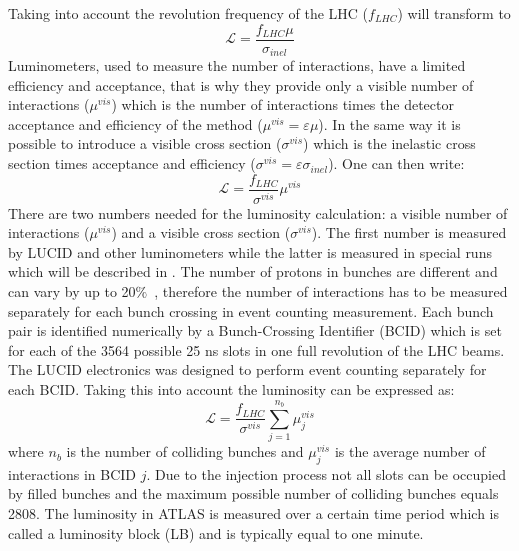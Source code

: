 Taking into account the revolution frequency of the LHC ($f_{LHC}$)  will transform to
\begin{equation}
\mathscr{L} = \dfrac{f_{LHC} \mu}{\sigma_{inel}}
\label{eq:lumi_average_mu}
\end{equation}
Luminometers, used to measure the number of interactions, have a limited efficiency and acceptance, 
that is why they provide only a visible number of interactions ($\mu^{vis}$) which is the number of interactions 
times the detector acceptance and efficiency of the method ($\mu^{vis} = \varepsilon \mu$).
In the same way it is possible to introduce a visible cross section ($\sigma^{vis}$) which is the inelastic 
cross section times acceptance and efficiency ($\sigma^{vis} = \varepsilon \sigma_{inel}$).
One can then write:
\begin{equation}
\mathscr{L} = \dfrac{f_{LHC}}{\sigma^{vis}} \mu^{vis}
\label{eq:lumi_bunch_sum_visible}
\end{equation}
There are two numbers needed for the luminosity calculation: a visible number of interactions ($\mu^{vis}$) and a visible cross section ($\sigma^{vis}$). 
The first number is measured by LUCID and other luminometers while the latter is measured in special runs which will be described in . 
The number of protons in bunches are different and can vary by up to 20$\%$~\cite{Aad:2013ucp}, 
therefore the number of interactions has to be measured separately for each bunch crossing in event counting measurement.
Each bunch pair is identified numerically by a Bunch-Crossing Identifier (BCID) which is set for each of the 3564 possible 25 ns slots in one full revolution of the LHC beams.
The LUCID electronics was designed to perform event counting separately for each BCID. 
Taking this into account the luminosity can be expressed as:
\begin{equation}
\mathscr{L} = \dfrac{f_{LHC}}{\sigma^{vis}} \sum_{j=1}^{n_{b}} \mu_{j}^{vis}
\label{eq:lumi_bunch_sum}
\end{equation}
where $n_{b}$ is the number of colliding bunches and $\mu_{j}^{vis}$ is the average number of interactions in BCID $j$.
Due to the injection process not all slots can be occupied by filled bunches and the maximum possible number of colliding bunches equals 2808.
The luminosity  in ATLAS is measured over a certain time period which is called a luminosity block (LB) and is typically equal to one minute. 

